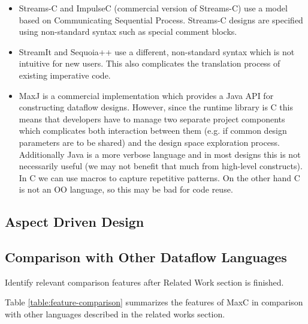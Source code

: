 \begin{itemize}

\item Streams-C and ImpulseC (commercial version of Streams-C) use a
  model based on Communicating Sequential Process. Streams-C designs
  are specified using non-standard syntax such as special comment
  blocks.

\item StreamIt and Sequoia++ use a different, non-standard syntax
  which is not intuitive for new users. This also complicates the
  translation process of existing imperative code.

\item MaxJ is a commercial implementation which provides a Java API
  for constructing dataflow designs. However, since the runtime
  library is C this means that developers have to manage two separate
  project components which complicates both interaction between them
  (e.g. if common design parameters are to be shared) and the design
  space exploration process. Additionally Java is a more verbose
  language and in most designs this is not necessarily useful (we may
  not benefit that much from high-level constructs). In C we can use
  macros to capture repetitive patterns. On the other hand C is not an
  OO language, so this may be bad for code reuse.

\end{itemize}

\subsection{Aspect Driven Design}


\subsection{Comparison with Other Dataflow Languages}

\TODO Identify relevant comparison features after Related Work section
is finished.

Table \ref{table:feature-comparison} summarizes the features of MaxC
in comparison with other languages described in the related works
section.

